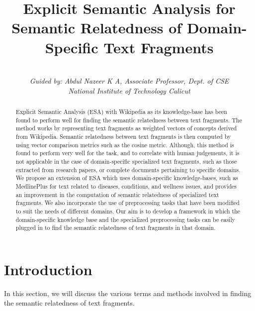 \documentclass[journal,transmag]{IEEEtran}
\begin{document}
\title{Explicit Semantic Analysis for Semantic Relatedness of Domain-Specific Text Fragments}

\author{
    \\
   \emph{Guided by: Abdul Nazeer K A, Associate Professor, Dept. of CSE\\National Institute of Technology Calicut}
}

\maketitle

\begin{abstract}
Explicit Semantic Analysis (ESA) with Wikipedia as its knowledge-base has been found to perform well for finding the semantic relatedness between text fragments. The method works by representing text fragments as weighted vectors of concepts derived from Wikipedia. Semantic relatedness between text fragments is then computed by using vector comparison metrics such as the cosine metric. Although, this method is found to perform very well for the task, and to correlate with human judgements, it is not applicable in the case of domain-specific specialized text fragments, such as those extracted from research papers, or complete documents pertaining to specific domains. We propose an extension of ESA which uses domain-specific knowledge-bases, such as MedlinePlus for text related to diseases, conditions, and wellness issues, and provides an improvement in the computation of semantic relatedness of specialized text fragments. We also incorporate the use of preprocessing tasks that have been modified to suit the needs of different domains. Our aim is to develop a framework in which the domain-specific knowledge base and the specialized preprocessing tasks can be easily plugged in to find the semantic relatedness of text fragments in that domain.
\end{abstract}

\section{\textbf{Introduction}}
In this section, we will discuss the various terms and methods involved in finding the semantic relatedness of text fragments.
\end{document}
